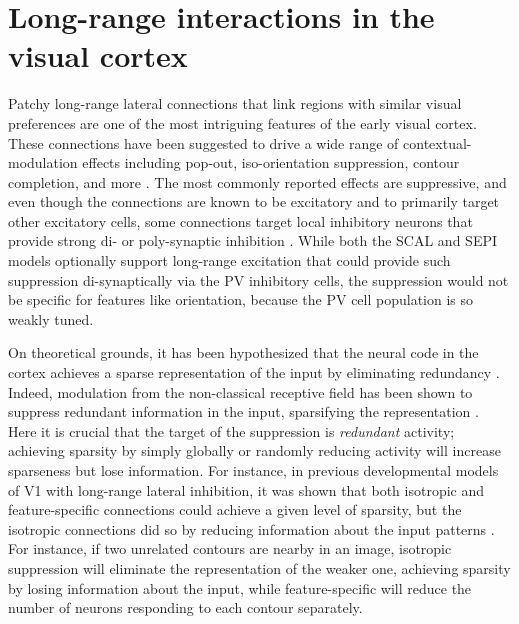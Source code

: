 \chapter{Long-range interactions in the visual cortex}

Patchy long-range lateral connections that link regions with similar
visual preferences are one of the most intriguing features of the
early visual cortex. These connections have been
suggested to drive a wide range of contextual-modulation effects
including pop-out, iso-orientation suppression, contour completion, and
more \citep{Gilbert1983, Hirsch1991, McGuire1991, Grinvald1994,
  Fitzpatrick2000, Hupe2001, Stettler2002}.  The most commonly
reported effects are suppressive, and even though the connections are
known to be excitatory and to primarily target other excitatory cells,
some connections target local inhibitory neurons that 
provide strong di- or poly-synaptic inhibition
\citep{Hirsch1991,Weliky1995}.  While both the SCAL and SEPI models
optionally support long-range excitation that could provide such
suppression di-synaptically via the PV inhibitory cells, the
suppression would not be specific for features like orientation,
because the PV cell population is so weakly tuned.

On theoretical grounds, it has been hypothesized that the neural code
in the cortex achieves a sparse representation of the input by
eliminating redundancy \citep{barlow:comneuron89,Olshausen1996}.
Indeed, modulation from the non-classical receptive field has been
shown to suppress redundant information in the input, sparsifying the
representation \citep{Vinje2000}. Here it is crucial that the
target of the suppression is \emph{redundant} activity; achieving
sparsity by simply globally or randomly reducing activity will
increase sparseness but lose information.  For instance, 
in previous developmental models of V1 with long-range lateral
inhibition, it was shown that both isotropic and feature-specific
connections could achieve a given level of sparsity, but the
isotropic connections did so by reducing information
about the input patterns \citep{Miikkulainen2005}.  For instance, if
two unrelated contours are nearby in an image, isotropic suppression
will eliminate the representation of the weaker one, achieving
sparsity by losing information about the input, while feature-specific
will reduce the number of neurons responding to each contour
separately.

